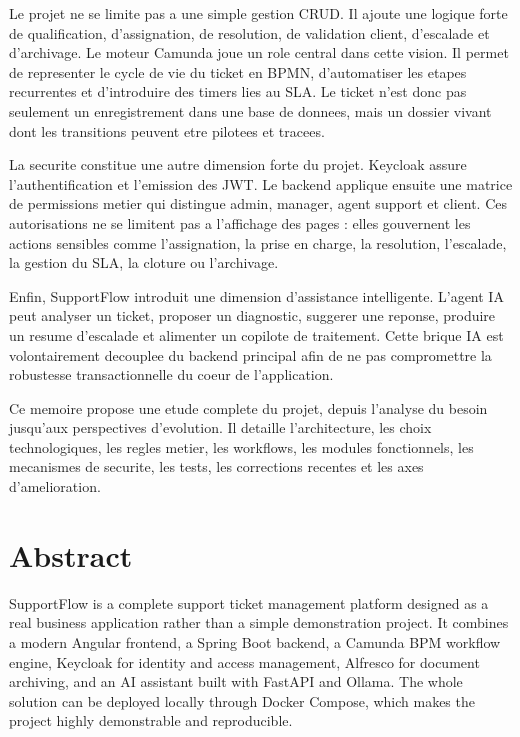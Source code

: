 \documentclass[12pt,a4paper,oneside]{report}
\begin{document}
Le projet ne se limite pas a une simple gestion CRUD. Il ajoute une logique forte de qualification, d'assignation, de resolution, de validation client, d'escalade et d'archivage. Le moteur Camunda joue un role central dans cette vision. Il permet de representer le cycle de vie du ticket en BPMN, d'automatiser les etapes recurrentes et d'introduire des timers lies au SLA. Le ticket n'est donc pas seulement un enregistrement dans une base de donnees, mais un dossier vivant dont les transitions peuvent etre pilotees et tracees.

La securite constitue une autre dimension forte du projet. Keycloak assure l'authentification et l'emission des JWT. Le backend applique ensuite une matrice de permissions metier qui distingue admin, manager, agent support et client. Ces autorisations ne se limitent pas a l'affichage des pages : elles gouvernent les actions sensibles comme l'assignation, la prise en charge, la resolution, l'escalade, la gestion du SLA, la cloture ou l'archivage.

Enfin, SupportFlow introduit une dimension d'assistance intelligente. L'agent IA peut analyser un ticket, proposer un diagnostic, suggerer une reponse, produire un resume d'escalade et alimenter un copilote de traitement. Cette brique IA est volontairement decouplee du backend principal afin de ne pas compromettre la robustesse transactionnelle du coeur de l'application.

Ce memoire propose une etude complete du projet, depuis l'analyse du besoin jusqu'aux perspectives d'evolution. Il detaille l'architecture, les choix technologiques, les regles metier, les workflows, les modules fonctionnels, les mecanismes de securite, les tests, les corrections recentes et les axes d'amelioration.

\chapter*{Abstract}

SupportFlow is a complete support ticket management platform designed as a real business application rather than a simple demonstration project. It combines a modern Angular frontend, a Spring Boot backend, a Camunda BPM workflow engine, Keycloak for identity and access management, Alfresco for document archiving, and an AI assistant built with FastAPI and Ollama. The whole solution can be deployed locally through Docker Compose, which makes the project highly demonstrable and reproducible.
\end{document}
